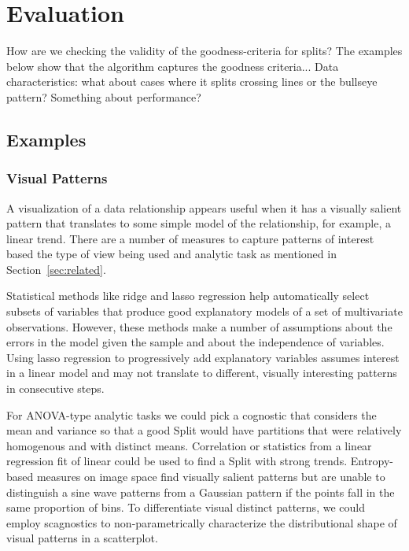

\section{Evaluation}
\label{sec:evaluation}
How are we checking the validity of the goodness-criteria for splits? The examples below show that the algorithm captures the goodness criteria...
Data characteristics: what about cases where it splits crossing lines or the bullseye pattern?
Something about performance?

\subsection{Examples}
\subsubsection{Visual Patterns}

 A visualization of a data relationship appears useful when it has a visually salient pattern that translates to some simple model of the relationship, for example, a linear trend. There are a number of measures to capture patterns of interest based the type of view being used and analytic task as mentioned in Section~\ref{sec:related}.
 
Statistical methods like ridge and lasso regression help automatically select subsets of variables that produce good explanatory models of a set of multivariate observations. However, these methods make a number of assumptions about the errors in the model given the sample and about the independence of  variables. Using lasso regression to progressively add explanatory variables assumes interest in a linear model and may not translate to different, visually interesting  patterns in consecutive steps.


For ANOVA-type analytic tasks we could pick a cognostic that considers the mean and variance so that a good Split would have partitions that were relatively homogenous and with distinct means. Correlation or statistics from a linear regression fit of linear could be used to find a Split with strong trends. Entropy-based measures on image space find visually salient patterns but are unable to distinguish a sine wave patterns from a Gaussian pattern if the points fall in the same proportion of bins. To differentiate visual distinct patterns, we could employ scagnostics to non-parametrically characterize the distributional shape of visual patterns in a scatterplot.


